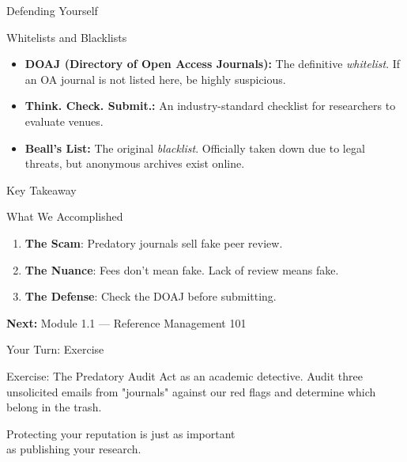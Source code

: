 \documentclass[aspectratio=169]{beamer}
\begin{document}
\begin{frame}{Defending Yourself}
  \begin{block}{Whitelists and Blacklists}
    \begin{itemize}
      \item \textbf{DOAJ (Directory of Open Access Journals):} The definitive \textit{whitelist}. If an OA journal is not listed here, be highly suspicious.
      \item \textbf{Think. Check. Submit.:} An industry-standard checklist for researchers to evaluate venues.
      \item \textbf{Beall's List:} The original \textit{blacklist}. Officially taken down due to legal threats, but anonymous archives exist online.
    \end{itemize}
  \end{block}
\end{frame}

\begin{frame}{Key Takeaway}
  \begin{block}{What We Accomplished}
    \begin{enumerate}
      \item \textbf{The Scam}: Predatory journals sell fake peer review.
      \item \textbf{The Nuance}: Fees don't mean fake. Lack of review means fake.
      \item \textbf{The Defense}: Check the DOAJ before submitting.
    \end{enumerate}
  \end{block}
  \vspace{0.3cm}
  \textbf{Next:} Module 1.1 --- Reference Management 101
\end{frame}

\begin{frame}{Your Turn: Exercise}
  \begin{exampleblock}{Exercise: The Predatory Audit}
    Act as an academic detective. Audit three unsolicited emails from "journals" against our red flags and determine which belong in the trash.
  \end{exampleblock}
\end{frame}

\begin{frame}[standout]
  Protecting your reputation is just as important\\
  as publishing your research.
\end{frame}
\end{document}
